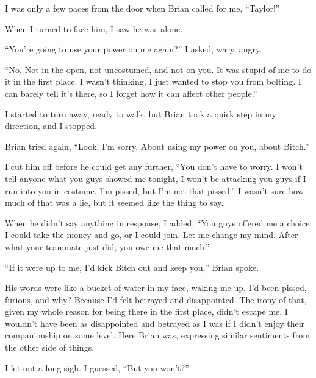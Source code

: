 I was only a few paces from the door when Brian called for me, ``Taylor!''



When I turned to face him, I saw he was alone.



``You're going to use your power on me again?'' I asked, wary, angry.



``No.  Not in the open, not uncostumed, and not on you.  It was stupid of me to do it in the first place.  I wasn't thinking, I just wanted to stop you from bolting.  I can barely tell it's there, so I forget how it can affect other people.''



I started to turn away, ready to walk, but Brian took a quick step in my direction, and I stopped.



Brian tried again, ``Look, I'm sorry.  About using my power on you, about Bitch.''



I cut him off before he could get any further, ``You don't have to worry.  I won't tell anyone what you guys showed me tonight, I won't be attacking you guys if I run into you in costume.  I'm pissed, but I'm not that pissed.''  I wasn't sure how much of that was a lie, but it seemed like the thing to say.



When he didn't say anything in response, I added, ``You guys offered me a choice.  I could take the money and go, or I could join.  Let me change my mind.  After what your teammate just did, you owe me that much.''



``If it were up to me, I'd kick Bitch out and keep you,'' Brian spoke.



His words were like a bucket of water in my face, waking me up.  I'd been pissed, furious, and why?  Because I'd felt betrayed and disappointed.  The irony of that, given my whole reason for being there in the first place, didn't escape me.  I wouldn't have been as disappointed and betrayed as I was if I didn't enjoy their companionship on some level.  Here Brian was, expressing similar sentiments from the other side of things.



I let out a long sigh.  I guessed, ``But you won't?''




